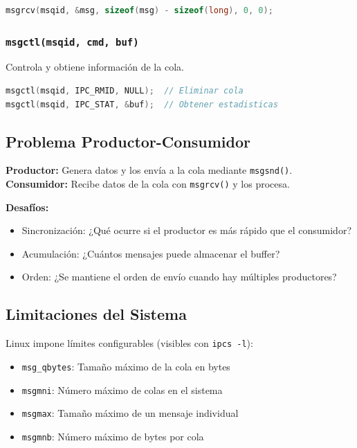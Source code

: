 \documentclass[10pt]{article}
\begin{document}
\begin{lstlisting}[language=C]
msgrcv(msqid, &msg, sizeof(msg) - sizeof(long), 0, 0);
\end{lstlisting}

\subsubsection{\texttt{msgctl(msqid, cmd, buf)}}
Controla y obtiene información de la cola.
\begin{lstlisting}[language=C]
msgctl(msqid, IPC_RMID, NULL);  // Eliminar cola
msgctl(msqid, IPC_STAT, &buf);  // Obtener estadisticas
\end{lstlisting}

\subsection{Problema Productor-Consumidor}
\textbf{Productor:} Genera datos y los envía a la cola mediante \texttt{msgsnd()}. \\
\textbf{Consumidor:} Recibe datos de la cola con \texttt{msgrcv()} y los procesa.

\textbf{Desafíos:}
\begin{itemize}
  \item Sincronización: ¿Qué ocurre si el productor es más rápido que el consumidor?
  \item Acumulación: ¿Cuántos mensajes puede almacenar el buffer?
  \item Orden: ¿Se mantiene el orden de envío cuando hay múltiples productores?
\end{itemize}

\subsection{Limitaciones del Sistema}
Linux impone límites configurables (visibles con \texttt{ipcs -l}):
\begin{itemize}
  \item \texttt{msg\_qbytes}: Tamaño máximo de la cola en bytes
  \item \texttt{msgmni}: Número máximo de colas en el sistema
  \item \texttt{msgmax}: Tamaño máximo de un mensaje individual
  \item \texttt{msgmnb}: Número máximo de bytes por cola
\end{itemize}

\clearpage

\end{document}

